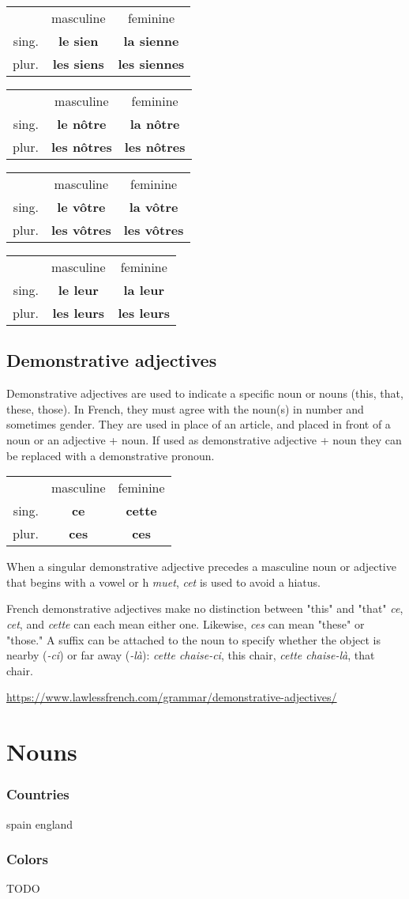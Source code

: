 \documentclass[a4paper,11pt,oneside]{book}
\newcommand{\noundecl}[4]{
\begin{tabular}{rcc}
 & masculine & feminine \\
 sing. & \textbf{#1} & \textbf{#2} \\
 plur. & \textbf{#3} & \textbf{#4}
\end{tabular}
}
\newcommand{\outref}[1]{\url{#1}}
\newcommand{\frtext}[1]{\emph{#1}}
\begin{document}
\noundecl{le sien}{la sienne}{les siens}{les siennes}
\noundecl{le nôtre}{la nôtre}{les nôtres}{les nôtres}

\noundecl{le vôtre}{la vôtre}{les vôtres}{les vôtres}
\noundecl{le leur}{la leur}{les leurs}{les leurs}

\subsection{Demonstrative adjectives}

Demonstrative adjectives are used to indicate a specific noun or nouns (this, that, these, those). In French, they must agree with the noun(s) in number and sometimes gender.
They are used in place of an article, and placed in front of a noun or an adjective + noun.
If used as demonstrative adjective + noun they can be replaced with a demonstrative pronoun.

\begin{center}
\noundecl{ce}{cette}{ces}{ces}
\end{center}

When a singular demonstrative adjective precedes a masculine noun or adjective that begins with a vowel or h \frtext{muet}, \frtext{cet} is used to avoid a hiatus.

French demonstrative adjectives make no distinction between "this" and "that" \frtext{ce}, \frtext{cet}, and \frtext{cette} can each mean either one.
Likewise, \frtext{ces} can mean "these" or "those."
A suffix can be attached to the noun to specify whether the object is nearby (\frtext{-ci}) or far away (\frtext{-là}):
\frtext{cette chaise-ci}, this chair, \frtext{cette chaise-là}, that chair.

\outref{https://www.lawlessfrench.com/grammar/demonstrative-adjectives/}

\section{Nouns}

\subsubsection{Countries}

spain
england

\subsubsection{Colors}

TODO
\end{document}
